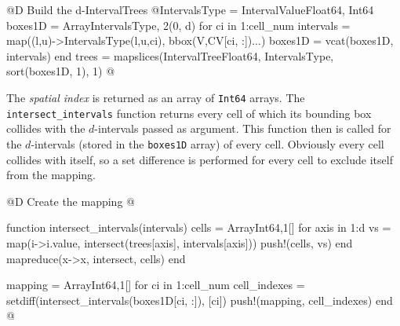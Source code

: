 \documentclass[10pt]{book}
\begin{document}
@D Build the d-IntervalTrees
@{IntervalsType = IntervalValue{Float64, Int64}
boxes1D = Array{IntervalsType, 2}(0, d)
for ci in 1:cell_num
    intervals = map((l,u)->IntervalsType(l,u,ci), bbox(V,CV[ci, :])...)
    boxes1D = vcat(boxes1D, intervals)
end
trees = mapslices(IntervalTree{Float64, IntervalsType}, sort(boxes1D, 1), 1)
@}

The \textit{spatial index} is returned as an array of \texttt{Int64} arrays.
The \texttt{intersect\_intervals} function returns every cell of which its bounding box collides with 
the $d$-intervals passed as argument. This function then is called for the $d$-intervals (stored in the \texttt{boxes1D} array) of every cell.
Obviously every cell collides with itself, so a set difference is performed for every cell to exclude itself from the mapping.

@D Create the mapping
@{function intersect_intervals(intervals)
    cells = Array{Int64,1}[]
    for axis in 1:d
        vs = map(i->i.value, intersect(trees[axis], intervals[axis]))
        push!(cells, vs)
    end
    mapreduce(x->x, intersect, cells)
end

mapping = Array{Int64,1}[]
for ci in 1:cell_num
    cell_indexes = setdiff(intersect_intervals(boxes1D[ci, :]), [ci])
    push!(mapping, cell_indexes)
end
@}

\backmatter


{}

\end{document}
